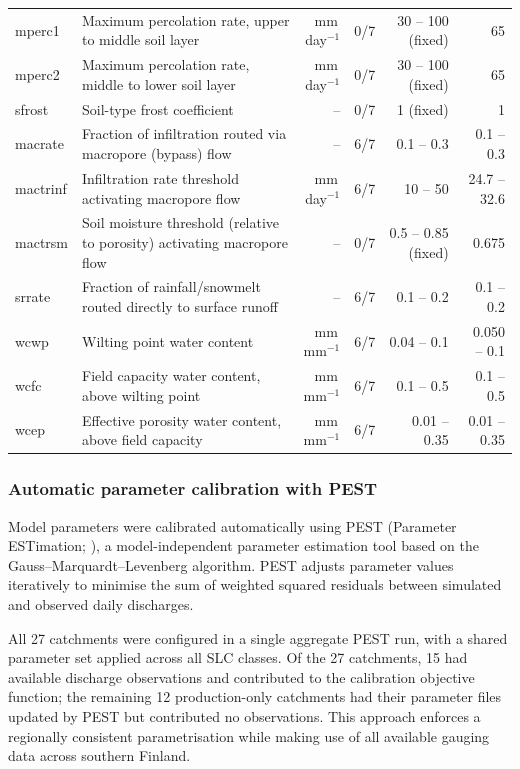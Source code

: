 \documentclass[draft]{agujournal2019}
\begin{document}
\begin{table}[p]
{\begin{tabular}{llrrrr}
mperc1 & Maximum percolation rate, upper to middle soil layer & mm\,day$^{-1}$ & 0/7 & 30 -- 100 (fixed) & 65 \\
mperc2 & Maximum percolation rate, middle to lower soil layer & mm\,day$^{-1}$ & 0/7 & 30 -- 100 (fixed) & 65 \\
sfrost & Soil-type frost coefficient & -- & 0/7 & 1 (fixed) & 1 \\
macrate & Fraction of infiltration routed via macropore (bypass) flow & -- & 6/7 & 0.1 -- 0.3 & 0.1 -- 0.3 \\
mactrinf & Infiltration rate threshold activating macropore flow & mm\,day$^{-1}$ & 6/7 & 10 -- 50 & 24.7 -- 32.6 \\
mactrsm & Soil moisture threshold (relative to porosity) activating macropore flow & -- & 0/7 & 0.5 -- 0.85 (fixed) & 0.675 \\
srrate & Fraction of rainfall/snowmelt routed directly to surface runoff & -- & 6/7 & 0.1 -- 0.2 & 0.1 -- 0.2 \\
wcwp & Wilting point water content & mm\,mm$^{-1}$ & 6/7 & 0.04 -- 0.1 & 0.050 -- 0.1 \\
wcfc & Field capacity water content, above wilting point & mm\,mm$^{-1}$ & 6/7 & 0.1 -- 0.5 & 0.1 -- 0.5 \\
wcep & Effective porosity water content, above field capacity & mm\,mm$^{-1}$ & 6/7 & 0.01 -- 0.35 & 0.01 -- 0.35 \\
\bottomrule
\end{tabular}%
}
\end{table}

\subsubsection{Automatic parameter calibration with PEST}
Model parameters were calibrated automatically using PEST (Parameter ESTimation; ), a model-independent parameter estimation tool based on the Gauss–Marquardt–Levenberg algorithm. PEST adjusts parameter values iteratively to minimise the sum of weighted squared residuals between simulated and observed daily discharges.

All 27 catchments were configured in a single aggregate PEST run, with a shared parameter set applied across all SLC classes. Of the 27 catchments, 15 had available discharge observations and contributed to the calibration objective function; the remaining 12 production-only catchments had their parameter files updated by PEST but contributed no observations. This approach enforces a regionally consistent parametrisation while making use of all available gauging data across southern Finland.
\end{document}
